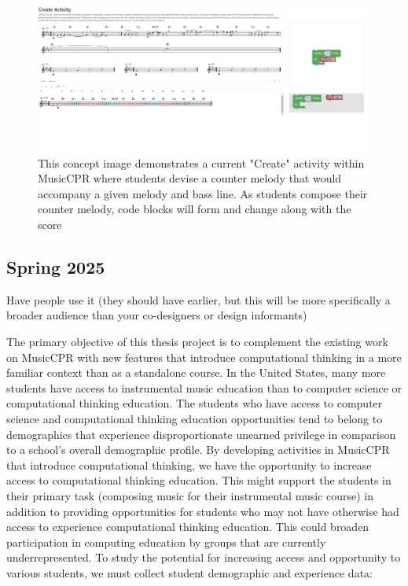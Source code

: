 \documentclass[manuscript,screen,review]{acmart}
\begin{document}
\begin{figure}
    \centering
    \includegraphics[width=1\linewidth]{proposal/Images/Design 1.png}
    \caption{This concept image demonstrates a current "Create" activity within MusicCPR where students devise a counter melody that would accompany a given melody and bass line. As students compose their counter melody, code blocks will form and change along with the score}
    \label{fig:enter-label}
\end{figure}
\subsection{Spring 2025}
Have people use it (they should have earlier, but this will be more specifically a broader audience than your co-designers or design informants) %

The primary objective of this thesis project is to complement the existing work on MusicCPR with new features that introduce computational thinking in a more familiar context than as a standalone course.
In the United States, many more students have access to instrumental music education than to computer science or computational thinking education.
The students who have access to computer science and computational thinking education opportunities tend to belong to demographics that experience disproportionate unearned privilege in comparison to a school's overall demographic profile.
By developing activities in MusicCPR that introduce computational thinking, we have the opportunity to increase access to computational thinking education.
This might support the students in their primary task (composing music for their instrumental music course) in addition to providing opportunities for students who may not have otherwise had access to experience computational thinking education.
This could broaden participation in computing education by groups that are currently underrepresented.
To study the potential for increasing access and opportunity to various students, we must collect student demographic and experience data:
\end{document}
